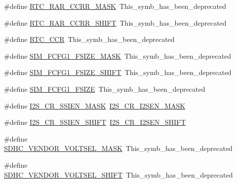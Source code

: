 \begin{DoxyCompactItemize}
\item 
\#define \hyperlink{group___backward___compatibility___symbols_ga4041ecda01ac6e2add01865c90abaeca}{R\+T\+C\+\_\+\+R\+A\+R\+\_\+\+C\+C\+R\+R\+\_\+\+M\+A\+SK}~This\+\_\+symb\+\_\+has\+\_\+been\+\_\+deprecated
\item 
\#define \hyperlink{group___backward___compatibility___symbols_ga9edf177783b9ab14d2174a3b74b57cdc}{R\+T\+C\+\_\+\+R\+A\+R\+\_\+\+C\+C\+R\+R\+\_\+\+S\+H\+I\+FT}~This\+\_\+symb\+\_\+has\+\_\+been\+\_\+deprecated
\item 
\#define \hyperlink{group___backward___compatibility___symbols_ga5aa0f9eb9a40d760e4123632e169b4b2}{R\+T\+C\+\_\+\+C\+CR}~This\+\_\+symb\+\_\+has\+\_\+been\+\_\+deprecated
\item 
\#define \hyperlink{group___backward___compatibility___symbols_gac077d5fae2458aea77fde5235b3617da}{S\+I\+M\+\_\+\+F\+C\+F\+G1\+\_\+\+F\+S\+I\+Z\+E\+\_\+\+M\+A\+SK}~This\+\_\+symb\+\_\+has\+\_\+been\+\_\+deprecated
\item 
\#define \hyperlink{group___backward___compatibility___symbols_ga3cb2d1d34119aae09272149c57502df1}{S\+I\+M\+\_\+\+F\+C\+F\+G1\+\_\+\+F\+S\+I\+Z\+E\+\_\+\+S\+H\+I\+FT}~This\+\_\+symb\+\_\+has\+\_\+been\+\_\+deprecated
\item 
\#define \hyperlink{group___backward___compatibility___symbols_ga064f157b2b27c45dbeb732abb951a31d}{S\+I\+M\+\_\+\+F\+C\+F\+G1\+\_\+\+F\+S\+I\+ZE}~This\+\_\+symb\+\_\+has\+\_\+been\+\_\+deprecated
\item 
\#define \hyperlink{group___backward___compatibility___symbols_ga99da26853d3acf8cf6ef11a09e5a7ca0}{I2\+S\+\_\+\+C\+R\+\_\+\+S\+S\+I\+E\+N\+\_\+\+M\+A\+SK}~\hyperlink{group___i2_s___register___masks_gadada70e943bd1d2f1cc20c86e976351a}{I2\+S\+\_\+\+C\+R\+\_\+\+I2\+S\+E\+N\+\_\+\+M\+A\+SK}
\item 
\#define \hyperlink{group___backward___compatibility___symbols_ga09d49807e27ff8297133115de30fb275}{I2\+S\+\_\+\+C\+R\+\_\+\+S\+S\+I\+E\+N\+\_\+\+S\+H\+I\+FT}~\hyperlink{group___i2_s___register___masks_ga92bdc8388297ae156c1b20aa24becbac}{I2\+S\+\_\+\+C\+R\+\_\+\+I2\+S\+E\+N\+\_\+\+S\+H\+I\+FT}
\item 
\#define \hyperlink{group___backward___compatibility___symbols_gaecd3639f4a53ededc6f279d8830f11ff}{S\+D\+H\+C\+\_\+\+V\+E\+N\+D\+O\+R\+\_\+\+V\+O\+L\+T\+S\+E\+L\+\_\+\+M\+A\+SK}~This\+\_\+symb\+\_\+has\+\_\+been\+\_\+deprecated
\item 
\#define \hyperlink{group___backward___compatibility___symbols_gabf43e67f74b7577c19572c627c7b9155}{S\+D\+H\+C\+\_\+\+V\+E\+N\+D\+O\+R\+\_\+\+V\+O\+L\+T\+S\+E\+L\+\_\+\+S\+H\+I\+FT}~This\+\_\+symb\+\_\+has\+\_\+been\+\_\+deprecated

\end{DoxyCompactItemize}
